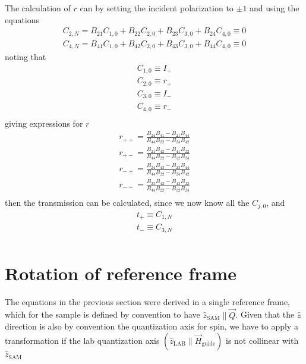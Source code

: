 \documentclass[%
 reprint,
 amsmath,
 amssymb,
 aps,
 prl,
 lengthcheck,%
]{revtex4-1}
\begin{document}
The calculation of $r$ can by setting 
the incident polarization to $\pm 1$ and using the equations
\begin{equation}
  \begin{array}{l}
    C_{2,N} = B_{21} C_{1,0} + B_{22} C_{2,0} + B_{23} C_{3,0} + B_{24} C_{4,0} \equiv 0\\
    C_{4,N} = B_{41} C_{1,0} + B_{42} C_{2,0} + B_{43} C_{3,0} + B_{44} C_{4,0} \equiv 0    
  \end{array}
\end{equation}
noting that
\begin{equation}
  \begin{array}{l}
    C_{1,0} \equiv I_+ \\
    C_{2,0} \equiv r_+ \\
    C_{3,0} \equiv I_- \\
    C_{4,0} \equiv r_- \\
  \end{array}
\end{equation}
giving expressions for $r$
\begin{equation}
  \begin{array}{l}
    r_{++} = \frac{B_{24}B_{41} - B_{21}B_{44}}{B_{44}B_{22} - B_{24}B_{42}}\\[0.3em]
    r_{+-} = \frac{B_{21}B_{42} - B_{41}B_{22}}{B_{44}B_{22} - B_{12}B_{24}}\\[0.3em]
    r_{-+} = \frac{B_{24}B_{43} - B_{23}B_{44}}{B_{44}B_{22} - B_{24}B_{42}}\\[0.3em]
    r_{--} = \frac{B_{23}B_{42} - B_{43}B_{22}}{B_{44}B_{22} - B_{12}B_{24}}\\[0.3em]
  \end{array}
\end{equation}
then the transmission can be calculated, since 
we now know all the $C_{j,0}$, and 
\begin{equation}
  \begin{array}{l}
    t_+ \equiv C_{1,N} \\
    t_- \equiv C_{3,N} \\
  \end{array}
\end{equation}


\section{Rotation of reference frame}

The equations in the previous section were derived in a single reference frame, 
which for the sample is defined by convention to have $\hat z_{\textrm{SAM}} \parallel \vec Q$.
Given that the $\hat z$ direction is also by convention the quantization axis 
for spin, we have to apply a transformation if the lab quantization axis 
$(\hat z_{\textrm {LAB}} \parallel \vec H_{\textrm{guide}})$ is not collinear with
$\hat z_{\textrm{SAM}}$
\end{document}
